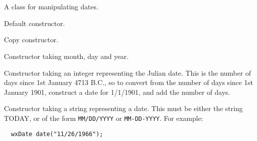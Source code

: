 \section{}\label{wxdate}

A class for manipulating dates.






\label{wxdateconstr}


Default constructor.


Copy constructor.


Constructor taking month, day and year.


Constructor taking an integer representing the Julian date. This is the number of days since
1st January 4713 B.C., so to convert from the number of days since 1st January 1901,
construct a date for 1/1/1901, and add the number of days.


Constructor taking a string representing a date. This must be either the string TODAY, or of the
form {\tt MM/DD/YYYY} or {\tt MM-DD-YYYY}. For example:

\begin{verbatim}
  wxDate date("11/26/1966");
\end{verbatim}








